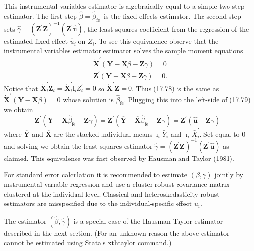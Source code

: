 \documentclass[10pt]{article}
\begin{document}
This instrumental variables estimator is algebraically equal to a simple two-step estimator. The first step $\widehat{\beta}=\widehat{\beta}_{\text {fe }}$ is the fixed effects estimator. The second step sets $\widehat{\gamma}=\left(\boldsymbol{Z}^{\prime} \boldsymbol{Z}\right)^{-1}\left(\boldsymbol{Z}^{\prime} \widehat{\boldsymbol{u}}\right)$, the least squares coefficient from the regression of the estimated fixed effect $\widehat{u}_{i}$ on $Z_{i}$. To see this equivalence observe that the instrumental variables estimator estimator solves the sample moment equations
$$
\begin{aligned}
&\dot{\boldsymbol{X}}^{\prime}(\boldsymbol{Y}-\boldsymbol{X} \beta-\boldsymbol{Z} \gamma)=0 \\
&\boldsymbol{Z}^{\prime}(\boldsymbol{Y}-\boldsymbol{X} \beta-\boldsymbol{Z} \gamma)=0 .
\end{aligned}
$$
Notice that $\dot{\boldsymbol{X}}_{i}^{\prime} \boldsymbol{Z}_{i}=\dot{\boldsymbol{X}}_{i}^{\prime} \boldsymbol{l}_{i} Z_{i}^{\prime}=0$ so $\dot{\boldsymbol{X}}^{\prime} \boldsymbol{Z}=0$. Thus (17.78) is the same as $\dot{\boldsymbol{X}}^{\prime}(\boldsymbol{Y}-\boldsymbol{X} \beta)=0$ whose solution is $\widehat{\beta}_{\mathrm{fe}}$. Plugging this into the left-side of (17.79) we obtain
$$
\boldsymbol{Z}^{\prime}\left(\boldsymbol{Y}-\boldsymbol{X} \widehat{\beta}_{\mathrm{fe}}-\boldsymbol{Z} \gamma\right)=\boldsymbol{Z}^{\prime}\left(\overline{\boldsymbol{Y}}-\overline{\boldsymbol{X}} \widehat{\beta}_{\mathrm{fe}}-\boldsymbol{Z} \gamma\right)=\boldsymbol{Z}^{\prime}(\widehat{\boldsymbol{u}}-\boldsymbol{Z} \gamma)
$$
where $\overline{\boldsymbol{Y}}$ and $\overline{\boldsymbol{X}}$ are the stacked individual means $\boldsymbol{\imath}_{i} \bar{Y}_{i}$ and $\boldsymbol{\imath}_{i} \bar{X}_{i}^{\prime}$. Set equal to 0 and solving we obtain the least squares estimator $\widehat{\gamma}=\left(\boldsymbol{Z}^{\prime} \boldsymbol{Z}\right)^{-1}\left(\boldsymbol{Z}^{\prime} \widehat{\boldsymbol{u}}\right)$ as claimed. This equivalence was first observed by Hausman and Taylor (1981).

For standard error calculation it is recommended to estimate $(\beta, \gamma)$ jointly by instrumental variable regression and use a cluster-robust covariance matrix clustered at the individual level. Classical and heteroskedasticity-robust estimators are misspecified due to the individual-specific effect $u_{i}$.

The estimator $(\widehat{\beta}, \widehat{\gamma})$ is a special case of the Hausman-Taylor estimator described in the next section. (For an unknown reason the above estimator cannot be estimated using Stata's xthtaylor command.)
\end{document}
